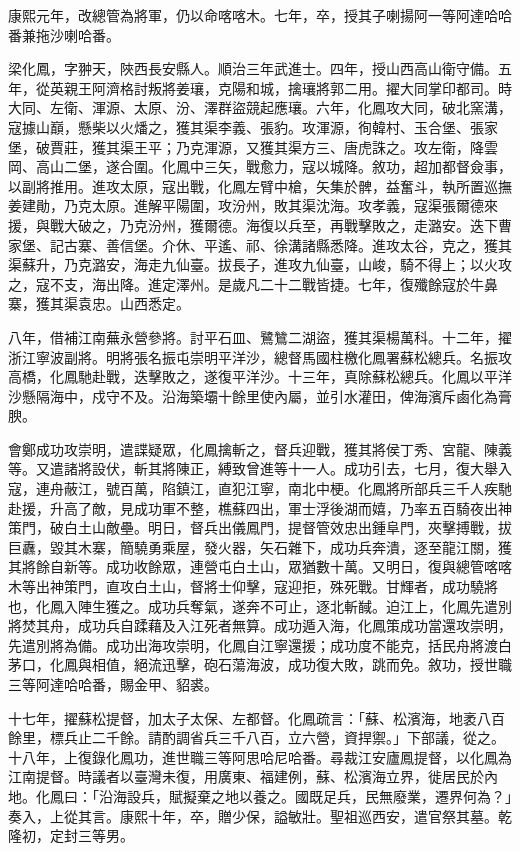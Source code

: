 \begin{pinyinscope}
康熙元年，改總管為將軍，仍以命喀喀木。七年，卒，授其子喇揚阿一等阿達哈哈番兼拖沙喇哈番。

梁化鳳，字翀天，陜西長安縣人。順治三年武進士。四年，授山西高山衛守備。五年，從英親王阿濟格討叛將姜瓖，克陽和城，擒瓖將郭二用。擢大同掌印都司。時大同、左衛、渾源、太原、汾、澤群盜競起應瓖。六年，化鳳攻大同，破北窯溝，寇據山巔，懸柴以火燔之，獲其渠李義、張豹。攻渾源，徇韓村、玉合堡、張家堡，破賈莊，獲其渠王平；乃克渾源，又獲其渠方三、唐虎誅之。攻左衛，降雲岡、高山二堡，遂合圍。化鳳中三矢，戰愈力，寇以城降。敘功，超加都督僉事，以副將推用。進攻太原，寇出戰，化鳳左臂中槍，矢集於髀，益奮斗，執所置巡撫姜建勛，乃克太原。進解平陽圍，攻汾州，敗其渠沈海。攻孝義，寇渠張爾德來援，與戰大破之，乃克汾州，獲爾德。海復以兵至，再戰擊敗之，走潞安。迭下曹家堡、記古寨、善信堡。介休、平遙、祁、徐溝諸縣悉降。進攻太谷，克之，獲其渠蘇升，乃克潞安，海走九仙臺。拔長子，進攻九仙臺，山峻，騎不得上；以火攻之，寇不支，海出降。進定澤州。是歲凡二十二戰皆捷。七年，復殲餘寇於牛鼻寨，獲其渠袁忠。山西悉定。

八年，借補江南蕪永營參將。討平石皿、鷺鷥二湖盜，獲其渠楊萬科。十二年，擢浙江寧波副將。明將張名振屯崇明平洋沙，總督馬國柱檄化鳳署蘇松總兵。名振攻高橋，化鳳馳赴戰，迭擊敗之，遂復平洋沙。十三年，真除蘇松總兵。化鳳以平洋沙懸隔海中，戍守不及。沿海築壩十餘里使內屬，並引水灌田，俾海濱斥鹵化為膏腴。

會鄭成功攻崇明，遣諜疑眾，化鳳擒斬之，督兵迎戰，獲其將侯丁秀、宮龍、陳義等。又遣諸將設伏，斬其將陳正，縛致曾進等十一人。成功引去，七月，復大舉入寇，連舟蔽江，號百萬，陷鎮江，直犯江寧，南北中梗。化鳳將所部兵三千人疾馳赴援，升高了敵，見成功軍不整，樵蘇四出，軍士浮後湖而嬉，乃率五百騎夜出神策門，破白土山敵壘。明日，督兵出儀鳳門，提督管效忠出鍾阜門，夾擊搏戰，拔巨纛，毀其木寨，簡驍勇乘屋，發火器，矢石雜下，成功兵奔潰，逐至龍江關，獲其將餘自新等。成功收餘眾，連營屯白土山，眾猶數十萬。又明日，復與總管喀喀木等出神策門，直攻白土山，督將士仰擊，寇迎拒，殊死戰。甘輝者，成功驍將也，化鳳入陣生獲之。成功兵奪氣，遂奔不可止，逐北斬馘。迫江上，化鳳先遣別將焚其舟，成功兵自蹂藉及入江死者無算。成功遁入海，化鳳策成功當還攻崇明，先遣別將為備。成功出海攻崇明，化鳳自江寧還援；成功度不能克，括民舟將渡白茅口，化鳳與相值，絕流迅擊，砲石蕩海波，成功復大敗，跳而免。敘功，授世職三等阿達哈哈番，賜金甲、貂裘。

十七年，擢蘇松提督，加太子太保、左都督。化鳳疏言：「蘇、松濱海，地袤八百餘里，標兵止二千餘。請酌調省兵三千八百，立六營，資捍禦。」下部議，從之。十八年，上復錄化鳳功，進世職三等阿思哈尼哈番。尋裁江安廬鳳提督，以化鳳為江南提督。時議者以臺灣未復，用廣東、福建例，蘇、松濱海立界，徙居民於內地。化鳳曰：「沿海設兵，賦擬棄之地以養之。國既足兵，民無廢業，遷界何為？」奏入，上從其言。康熙十年，卒，贈少保，謚敏壯。聖祖巡西安，遣官祭其墓。乾隆初，定封三等男。


\end{pinyinscope}
